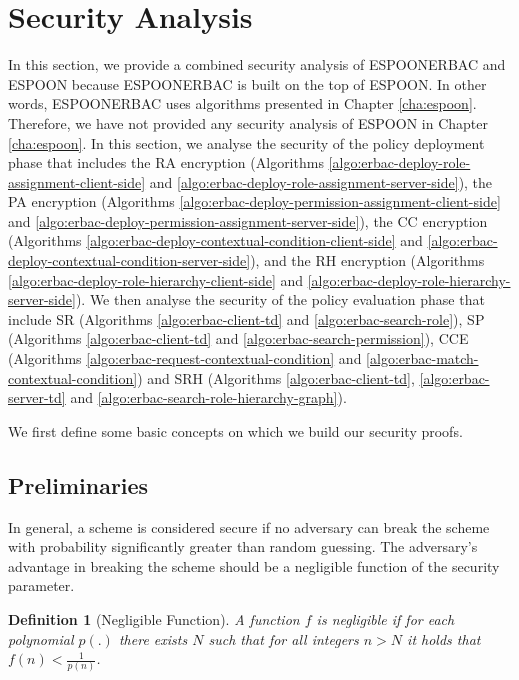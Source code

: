 \documentclass[epsfig,a4paper,11pt,titlepage]{book}
\newtheorem{definition}{Definition}
\numberwithin{algorithm}{chapter}
\begin{document}
\section{Security Analysis}
\label{sec:erbac-security-analysis} 
In this section, we provide a combined security analysis of \gls{ESPOONERBAC} and \gls{ESPOON} because \gls{ESPOONERBAC} is built on the top of \gls{ESPOON}. In other words, \gls{ESPOONERBAC} uses algorithms presented in Chapter \ref{cha:espoon}. Therefore, we have not provided any security analysis of \gls{ESPOON} in Chapter \ref{cha:espoon}. In this section, we analyse the security of the policy deployment phase that includes the \gls{RA} encryption (Algorithms \ref{algo:erbac-deploy-role-assignment-client-side} and \ref{algo:erbac-deploy-role-assignment-server-side}), the \gls{PA} encryption (Algorithms \ref{algo:erbac-deploy-permission-assignment-client-side} and \ref{algo:erbac-deploy-permission-assignment-server-side}), the \gls{CC} encryption (Algorithms \ref{algo:erbac-deploy-contextual-condition-client-side} and \ref{algo:erbac-deploy-contextual-condition-server-side}), and the \gls{RH} encryption (Algorithms \ref{algo:erbac-deploy-role-hierarchy-client-side} and \ref{algo:erbac-deploy-role-hierarchy-server-side}). We then analyse the security of the policy evaluation phase that include \gls{SR} (Algorithms \ref{algo:erbac-client-td} and \ref{algo:erbac-search-role}), \gls{SP} (Algorithms \ref{algo:erbac-client-td} and \ref{algo:erbac-search-permission}), \gls{CCE} (Algorithms \ref{algo:erbac-request-contextual-condition} and \ref{algo:erbac-match-contextual-condition}) and \gls{SRH} (Algorithms \ref{algo:erbac-client-td}, \ref{algo:erbac-server-td} and \ref{algo:erbac-search-role-hierarchy-graph}). 

We first define some basic concepts on which we build our security proofs.

\subsection{Preliminaries}
In general, a scheme is considered secure if no adversary can break the scheme with probability significantly greater than random guessing. The adversary's advantage in breaking the scheme should be a negligible function of the security parameter.

\begin{definition}[Negligible Function]
A function $f$ is negligible if for each polynomial $p(.)$ there exists $N$ such that for all integers $n > N$ it holds that 
$f(n) < \frac{1}{p(n)}$.
\end{definition}
\end{document}
